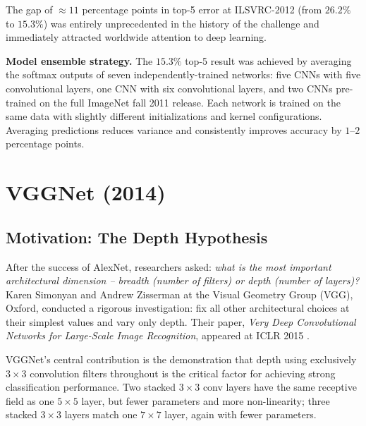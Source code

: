 \documentclass[12pt,a4paper]{article}
\begin{document}
The gap of $\approx 11$ percentage points in top-5 error at ILSVRC-2012 (from $26.2\%$ to $15.3\%$) was entirely unprecedented in the history of the challenge and immediately attracted worldwide attention to deep learning.

\begin{example}
\textbf{Model ensemble strategy.} The $15.3\%$ top-5 result was achieved by averaging the softmax outputs of seven independently-trained networks: five CNNs with five convolutional layers, one CNN with six convolutional layers, and two CNNs pre-trained on the full ImageNet fall 2011 release. Each network is trained on the same data with slightly different initializations and kernel configurations. Averaging predictions reduces variance and consistently improves accuracy by $1$--$2$ percentage points.
\end{example}

\section{VGGNet (2014)}
\label{sec:vggnet}

\subsection{Motivation: The Depth Hypothesis}

After the success of AlexNet, researchers asked: \emph{what is the most important architectural dimension -- breadth (number of filters) or depth (number of layers)?} Karen Simonyan and Andrew Zisserman at the Visual Geometry Group (VGG), Oxford, conducted a rigorous investigation: fix all other architectural choices at their simplest values and vary only depth. Their paper, \emph{Very Deep Convolutional Networks for Large-Scale Image Recognition}, appeared at ICLR 2015 \cite{vgg2015}.

\begin{keyinsight}
VGGNet's central contribution is the demonstration that depth using exclusively $3\times3$ convolution filters throughout is the critical factor for achieving strong classification performance. Two stacked $3\times3$ conv layers have the same receptive field as one $5\times5$ layer, but fewer parameters and more non-linearity; three stacked $3\times3$ layers match one $7\times7$ layer, again with fewer parameters.
\end{keyinsight}
\end{document}
